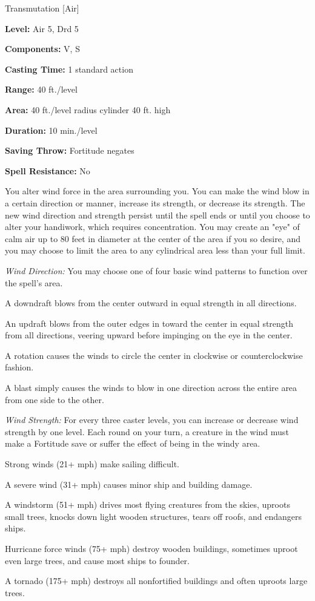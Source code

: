 
Transmutation [Air]

\textbf{Level:} Air 5, Drd 5

\textbf{Components:} V, S

\textbf{Casting Time:} 1 standard action

\textbf{Range:} 40 ft./level

\textbf{Area:} 40 ft./level radius cylinder 40 ft. high

\textbf{Duration:} 10 min./level

\textbf{Saving Throw:} Fortitude negates

\textbf{Spell Resistance:} No

You alter wind force in the area surrounding you. You can make the wind blow in 
a certain direction or manner, increase its strength, or decrease its strength. 
The new wind direction and strength persist until the spell ends or until you choose 
to alter your handiwork, which requires concentration. You may create an "eye" 
of calm air up to 80 feet in diameter at the center of the area if you so desire, 
and you may choose to limit the area to any cylindrical area less than your full 
limit.

\textit{Wind Direction:} You may choose one of four basic wind patterns to function 
over the spell's area.%

A downdraft blows from the center outward in equal strength in all directions.%

An updraft blows from the outer edges in toward the center in equal strength from 
all directions, veering upward before impinging on the eye in the center.%

A rotation causes the winds to circle the center in clockwise or counterclockwise 
fashion.%

A blast simply causes the winds to blow in one direction across the entire area 
from one side to the other.

\textit{Wind Strength:} For every three caster levels, you can increase or decrease 
wind strength by one level. Each round on your turn, a creature in the wind must 
make a Fortitude save or suffer the effect of being in the windy area.

Strong winds (21+ mph) make sailing difficult.

A severe wind (31+ mph) causes minor ship and building damage.

A windstorm (51+ mph) drives most flying creatures from the skies, uproots small 
trees, knocks down light wooden structures, tears off roofs, and endangers ships.

Hurricane force winds (75+ mph) destroy wooden buildings, sometimes uproot even 
large trees, and cause most ships to founder.

A tornado (175+ mph) destroys all nonfortified buildings and often uproots large 
trees.

